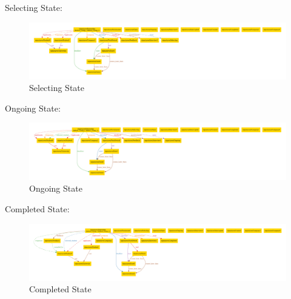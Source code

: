 \par Selecting State:

\begin{figure}[H]
    \centering
    \includegraphics[width=1\textwidth]{Images/Alloy_images/Alloy_1-3.pdf}
    \caption{Selecting State}
\end{figure}

\par Ongoing State:
\begin{figure}[H]
    \centering
    \includegraphics[width=1\textwidth]{Images/Alloy_images/Alloy_1-4.pdf}
    \caption{Ongoing State}
\end{figure}

\par Completed State:
\begin{figure}[H]
    \centering
    \includegraphics[width=1\textwidth]{Images/Alloy_images/Alloy_1-5.pdf}
    \caption{Completed State}
\end{figure}


